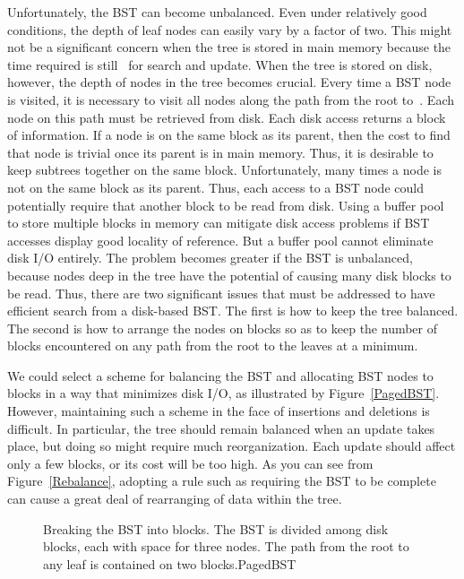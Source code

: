 Unfortunately, the BST can become unbalanced.
Even under relatively good conditions, the depth of leaf nodes
can easily vary by a factor of two.
This might not be a significant concern when the tree is stored in
main memory because the time required is still \Thetalogn\ for search
and update.
When the tree is stored on disk, however, the depth of nodes in the
tree becomes crucial.
Every time a BST node~ is visited, it is necessary to visit
all nodes along the path from the root to~.
Each node on this path must be retrieved from disk.
Each disk access returns a block of information.
If a node is on the same block as its parent, then the cost to find
that node is trivial once its parent is in main memory.
Thus, it is desirable to keep subtrees together on the same
block.
Unfortunately, many times a node is not on the same block as its
parent.
Thus, each access to a BST node could potentially require that another
block to be read from disk.
Using a buffer pool to store multiple blocks in
memory can mitigate disk access problems if BST accesses display good
locality of reference.
But a buffer pool cannot eliminate disk I/O entirely.
The problem becomes greater if the BST is unbalanced, because nodes deep
in the tree have the potential of causing many disk blocks to be read.
Thus, there are two significant issues that must be addressed
to have efficient search from a disk-based BST.
The first is how to keep the tree balanced.
The second is how to arrange the nodes on blocks so as to keep the
number of blocks encountered on any path from the root to the leaves at
a minimum.

We could select a scheme for balancing the BST and allocating BST
nodes to blocks in a way that minimizes disk I/O, as illustrated by
Figure~\ref{PagedBST}.
However, maintaining such a scheme in the face of insertions and
deletions is difficult.
In particular, the tree should remain balanced when an update takes
place, but doing so might require much reorganization.
Each update should affect only a few blocks, or its cost will be
too high.
As you can see from Figure~\ref{Rebalance},
adopting a rule such as requiring the BST to be complete can cause a
great deal of rearranging of data within the tree.

\begin{figure}
\vspace{-\bigskipamount}

{Breaking the BST into blocks.
The BST is divided among disk blocks, each with space for three nodes.
The path from the root to any leaf is contained on two blocks.}{PagedBST}
\bigskip
\end{figure}

